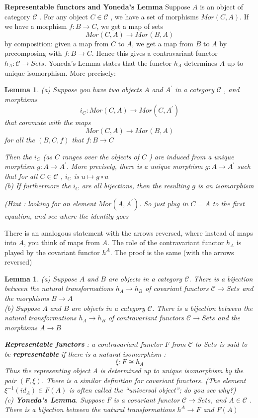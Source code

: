 \documentclass{article}
\newtheorem{lemma}[theorem]{Lemma}
\begin{document}
\textbf{Representable functors and Yoneda’s Lemma}
Suppose $A$ is an object of category $\mathscr C$ . For any object $C \in\mathscr C$ , we have a set of morphisms $Mor(C, A)$. If we have a morphism $f : B \rightarrow C$,
we get a map of sets
$$
Mor(C, A) \rightarrow Mor(B, A)
$$
by composition: given a map from $C$ to $A$, we get a map from $B$ to $A$ by precomposing with $f : B \rightarrow C$. Hence this gives a contravariant functor $h_A :\mathscr C \rightarrow Sets$.
Yoneda’s Lemma states that the functor $h_A$ determines $A$ up to unique isomorphism. More precisely:
\begin{lemma}
    (a) Suppose you have two objects $A$ and $A^\prime$ in a category $\mathscr C$ , and morphisms
    $$
    i_C : Mor(C, A) \rightarrow Mor(C, A^\prime)
    $$
    that commute with the maps
    $$
Mor(C, A) \rightarrow Mor(B, A)
$$ for all the $(B,C,f)$ that $f : B\rightarrow C$

Then the $i_C$ (as $C$ ranges over the objects of $C$ ) are induced from a unique morphism $g: A \rightarrow A^\prime$. More precisely, there is a unique morphism $g: A \rightarrow A^\prime$
such that for all $C \in\mathscr C$ , $i_C$ is $u \mapsto g\circ u$
\\
(b) If furthermore the $i_C$ are all bijections, then the resulting $g$ is an isomorphism

(Hint : looking for an element $Mor(A, A^\prime)$. So just plug in $C = A$ to
the first equation, and see where the identity goes
\end{lemma}
There is an analogous statement with the arrows reversed, where instead of maps into $A$, you think of maps from $A$. The role of the contravariant functor $h_A$ is played by the covariant functor $h^A$. The proof is the same (with the arrows reversed)
\begin{lemma}
    (a) Suppose $A$ and $B$ are objects in a category $\mathscr C$. There is a bijection between the natural transformations $h_A \rightarrow h_B$ of covariant functors $\mathscr C \rightarrow Sets$  and the morphisms $B \rightarrow A$
    \\
    (b) Suppose $A$ and $B$ are objects in a category $\mathscr C$. There is a bijection between the natural transformations $h_A \rightarrow h_B$ of contravariant functors $\mathscr C \rightarrow Sets$  and the morphisms $A \rightarrow B$
    
    \textbf{Representable functors} : a contravariant functor $F$ from $\mathscr C$ to $Sets$ is said to be \textbf{representable} if there is a natural isomorphism :
    $$
    \xi : F\cong h_A
    $$
    Thus the representing object A is determined up to unique isomorphism by the pair $(F, \xi)$. There is a similar definition for covariant functors. (The element $\xi^{-1}(id_A) \in F(A)$ is often called the “universal object”; do you see why?)
    \\
    (c) \textbf{Yoneda’s Lemma}. Suppose $F$ is a covariant functor $\mathscr C \rightarrow Sets$, and $A \in\mathscr C$ . There is a bijection between the natural transformations $h^A \rightarrow F$ and $F(A)$
\end{lemma}
\end{document}
